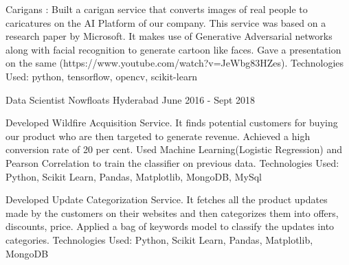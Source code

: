 \begin{cventries}
{\begin{cvitems}
        \item{Carigans : Built a carigan service that converts images of real people to caricatures on the AI Platform of our company. This service was based on a research paper by Microsoft. It makes use of Generative Adversarial networks along with facial recognition to generate cartoon like faces. Gave a presentation on the same (https://www.youtube.com/watch?v=JeWbg83HZes). Technologies Used: python, tensorflow, opencv, scikit-learn}     
	\end{cvitems}
    }

  \cventry
    {Data Scientist} %
    {Nowfloats} %
    {Hyderabad} %
    {June 2016 - Sept 2018} %
    {
      \begin{cvitems} %
        \item {Developed Wildfire Acquisition Service. It finds potential customers for buying our product who are then targeted to generate revenue. Achieved a high conversion rate of 20 per cent. Used Machine Learning(Logistic Regression) and Pearson Correlation to train the classifier on previous data. Technologies Used: Python, Scikit Learn, Pandas, Matplotlib, MongoDB, MySql  }
        \item {Developed Update Categorization Service. It fetches all the product updates made by the customers on their websites and then categorizes them into offers, discounts, price. Applied a bag of keywords model to classify the updates into categories. Technologies Used: Python, Scikit Learn, Pandas, Matplotlib, MongoDB  }
      \end{cvitems}
    }

\end{cventries}
